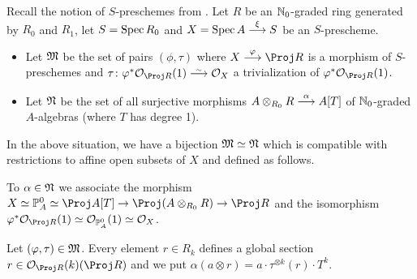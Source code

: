 \documentclass[a4paper,parskip=half,numbers=enddot, DIV=12]{scrreprt}
\begin{document}
Recall the notion of $S$-preschemes from \cite[Definition~1.5.7]{alggeo1}. Let $R$ be an $\mathbb{N}_0$-graded ring generated by $R_0$ and $R_1$, let $S=\operatorname{Spec} R_0$ and $X=\Spec A\morphism[\xi]S$ be an $S$-prescheme. 
\begin{itemize}
	\item Let $\mathfrak{M}$ be the set of pairs $(\phi,\tau)$ where $X\morphism[\phi]\Proj R$ is a morphism of $S$-preschemes and $\tau\colon \phi^*\Oo_{\Proj R}(1)\isomorphism\Oo_X$ a trivialization of $\phi^*\Oo_{\Proj R}(1)$.
	\item Let $\mathfrak{N}$ be the set of all surjective morphisms $A\otimes_{R_0}R\morphism[\alpha]A[T]$ of $\mathbb{N}_0$-graded $A$-algebras (where $T$ has degree 1).
\end{itemize}
\begin{lem}
	In the above situation, we have a bijection $\mathfrak{M}\simeq\mathfrak{N}$ which is compatible with restrictions to affine open subsets of $X$ and defined as follows.
	\begin{alphanumerate}
		\item To $\alpha\in\mathfrak{N}$ we associate the morphism $X\simeq \IP_A^0\simeq\Proj A[T]\morphism\Proj (A\otimes_{R_0}R)\morphism\Proj R$ and the isomorphism $\phi^*\Oo_{\Proj R}(1)\simeq \Oo_{\IP_A^0}(1)\simeq \Oo_X$.
		\item Let $(\varphi,\tau)\in\mathfrak{M}$. Every element $r\in R_k$ defines a global section $r\in\Oo_{\Proj R}(k)(\Proj R)$ and we put $\alpha(a\otimes r)=a\cdot \tau^{\otimes k}(r)\cdot T^k$.
	\end{alphanumerate}
\end{lem}
\end{document}

